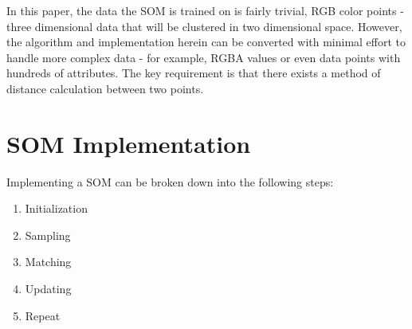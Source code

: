 \documentclass[11pt]{article}
\begin{document}
In this paper, the data the SOM is trained on is fairly trivial, RGB color points - three dimensional data that will be clustered in two dimensional space. However, the algorithm and implementation herein can be converted with minimal effort to handle more complex data - for example, RGBA values or even data points with hundreds of attributes. The key requirement is that there exists a method of distance calculation between two points.
\section{SOM Implementation}
Implementing a SOM can be broken down into the following steps:
\begin{enumerate}
\item{Initialization}
\item{Sampling}
\item{Matching}
\item{Updating}
\item{Repeat}
\end{enumerate}
\end{document}
